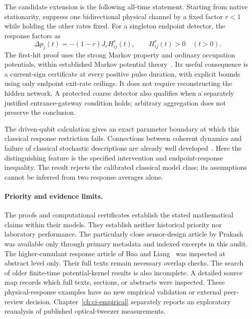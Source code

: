 The candidate extension is the following all-time statement. Starting from
native stationarity, suppress one bidirectional physical channel by a fixed
factor $r<1$ while holding the other rates fixed. For a singleton endpoint
detector, the response factors as
\begin{equation}
 \Delta p_j(t)=-(1-r)J_e H_{ij}^{r}(t),
 \qquad H_{ij}^{r}(t)>0\quad(t>0).
\end{equation}
The first-hit proof uses the strong Markov property and ordinary occupation
potentials, within established Markov potential theory~\cite{ac_coolen}.
Its useful consequence is a current-sign certificate at every positive pulse
duration, with explicit bounds using only endpoint exit-rate ceilings.
It does not require reconstructing the hidden network. A protected coarse
detector also qualifies when a separately justified entrance-gateway condition
holds; arbitrary aggregation does not preserve the conclusion.

The driven-qubit calculation gives an exact parameter boundary at which this
classical response restriction fails. Connections between coherent dynamics
and failure of classical stochastic descriptions are already well
developed~\cite{ac_smirne,ac_prech}. Here the distinguishing feature is the
specified intervention and endpoint-response inequality. The result rejects
the calibrated classical model class; its assumptions cannot be inferred
from two response averages alone.

\paragraph{Priority and evidence limits.}
The proofs and computational certificates establish the stated mathematical
claims within their models. They establish neither historical priority nor
laboratory performance. The particularly close sensor-design article by
Prakash~\cite{ac_prakash} was available only through primary metadata and
indexed excerpts in this audit. The higher-cumulant response article of Bao
and Liang~\cite{ac_bao_higher} was inspected at abstract level only. Their full
texts remain necessary overlap checks. The search of older finite-time
potential-kernel results is also incomplete. A detailed source map records
which full texts, sections, or abstracts were inspected. These physical-response examples have no new empirical validation or external
peer-review decision. Chapter~\ref{ch:ci-empirical} separately reports an
exploratory reanalysis of published optical-tweezer measurements.

